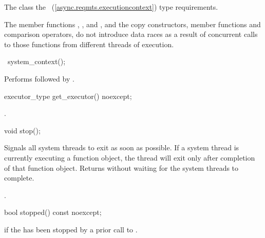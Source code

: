 \pnum
The class   the ~(\ref{async.reqmts.executioncontext}) type requirements.

\pnum
The  member functions , , and , and the  copy constructors, member functions and comparison operators, do not introduce data races as a result of concurrent calls to those functions from different threads of execution.

%
\begin{itemdecl}
~system_context();
\end{itemdecl}

\begin{itemdescr}
\pnum
\effects Performs  followed by .
\end{itemdescr}

%
\begin{itemdecl}
executor_type get_executor() noexcept;
\end{itemdecl}

\begin{itemdescr}
\pnum
\returns {}.
\end{itemdescr}

%
\begin{itemdecl}
void stop();
\end{itemdecl}

\begin{itemdescr}
\pnum
\effects Signals all system threads to exit as soon as possible. If a system thread is currently executing a function object, the thread will exit only after completion of that function object. Returns without waiting for the system threads to complete.

\pnum
\postconditions {}.
\end{itemdescr}

%
\begin{itemdecl}
bool stopped() const noexcept;
\end{itemdecl}

\begin{itemdescr}
\pnum
\returns {} if the  has been stopped by a prior call to .
\end{itemdescr}


